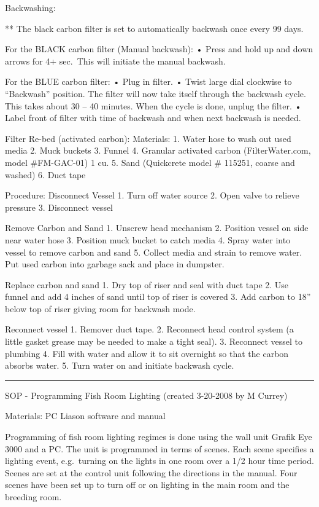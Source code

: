 \documentclass[
]{book}
\begin{document}
Backwashing:

** The black carbon filter is set to automatically backwash once every 99 days.

For the BLACK carbon filter (Manual backwash):
• Press and hold up and down arrows for 4+ sec.~This will initiate the manual backwash.

For the BLUE carbon filter:
• Plug in filter.
• Twist large dial clockwise to ``Backwash'' position. The filter will now take itself through the backwash cycle. This takes about 30 -- 40 minutes. When the cycle is done, unplug the filter.
• Label front of filter with time of backwash and when next backwash is needed.

Filter Re-bed (activated carbon):
Materials:
1. Water hose to wash out used media
2. Muck buckets
3. Funnel
4. Granular activated carbon (FilterWater.com, model \#FM-GAC-01) 1 cu.
5. Sand (Quickcrete model \# 115251, coarse and washed)
6. Duct tape

Procedure:
Disconnect Vessel
1. Turn off water source
2. Open valve to relieve pressure
3. Disconnect vessel

Remove Carbon and Sand
1. Unscrew head mechanism
2. Position vessel on side near water hose
3. Position muck bucket to catch media
4. Spray water into vessel to remove carbon and sand
5. Collect media and strain to remove water. Put used carbon into garbage sack and place in dumpster.

Replace carbon and sand
1. Dry top of riser and seal with duct tape
2. Use funnel and add 4 inches of sand until top of riser is covered
3. Add carbon to 18'' below top of riser giving room for backwash mode.

Reconnect vessel
1. Remover duct tape.
2. Reconnect head control system (a little gasket grease may be needed to make a tight seal).
3. Reconnect vessel to plumbing
4. Fill with water and allow it to sit overnight so that the carbon absorbs water.
5. Turn water on and initiate backwash cycle.

\begin{center}\rule{0.5\linewidth}{0.5pt}\end{center}

SOP - Programming Fish Room Lighting
(created 3-20-2008 by M Currey)

Materials:
PC
Liason software and manual

Programming of fish room lighting regimes is done using the wall unit Grafik Eye 3000 and a PC. The unit is programmed in terms of scenes. Each scene specifies a lighting event, e.g.~turning on the lights in one room over a 1/2 hour time period. Scenes are set at the control unit following the directions in the manual. Four scenes have been set up to turn off or on lighting in the main room and the breeding room.
\end{document}
